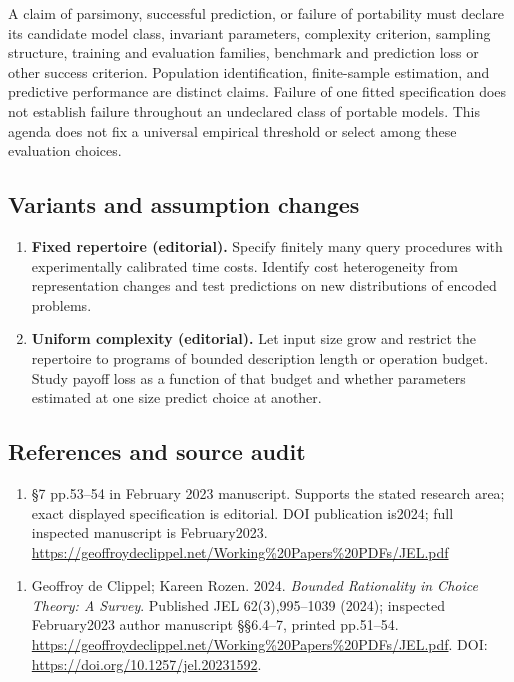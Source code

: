 \documentclass[11pt,a4paper]{article}
\begin{document}
A claim of parsimony, successful prediction, or failure of portability must declare its candidate model class, invariant parameters, complexity criterion, sampling structure, training and evaluation families, benchmark and prediction loss or other success criterion. Population identification, finite-sample estimation, and predictive performance are distinct claims. Failure of one fitted specification does not establish failure throughout an undeclared class of portable models. This agenda does not fix a universal empirical threshold or select among these evaluation choices.
\subsection*{Variants and assumption changes}
\begin{enumerate}
\item \textbf{Fixed repertoire (editorial).} Specify finitely many query procedures with experimentally calibrated time costs. Identify cost heterogeneity from representation changes and test predictions on new distributions of encoded problems.
\item \textbf{Uniform complexity (editorial).} Let input size grow and restrict the repertoire to programs of bounded description length or operation budget. Study payoff loss as a function of that budget and whether parameters estimated at one size predict choice at another.
\end{enumerate}
\subsection*{References and source audit}
\begin{enumerate}
\item §7 pp.53–54 in February 2023 manuscript. Supports the stated research area; exact displayed specification is editorial. DOI publication is2024; full inspected manuscript is February2023. \url{https://geoffroydeclippel.net/Working%20Papers%20PDFs/JEL.pdf}
\end{enumerate}
\begin{enumerate}\raggedright
\item\hypertarget{definitions:source:30007556:1}{} Geoffroy de Clippel; Kareen Rozen. 2024. \emph{Bounded Rationality in Choice Theory: A Survey}. Published JEL 62(3),995–1039 (2024); inspected February2023 author manuscript §§6.4–7, printed pp.51–54.
\url{https://geoffroydeclippel.net/Working%20Papers%20PDFs/JEL.pdf}.
DOI: \url{https://doi.org/10.1257/jel.20231592}.
\end{enumerate}
\end{document}

